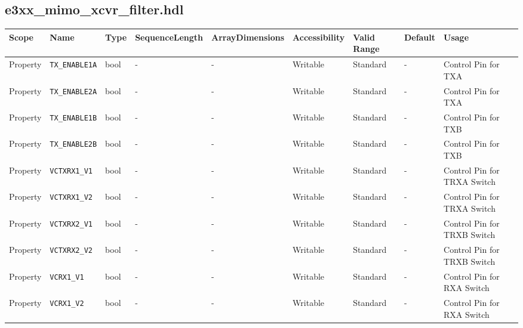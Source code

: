 \documentclass{article}
\def\comp{e3xx\_mimo\_xcvr\_filter}
\def\comp{e3xx\_mimo\_xcvr\_filter}
\begin{document}
\begin{landscape}
\subsection*{\comp.hdl}
	\begin{scriptsize}
		\begin{tabular}{|p{2cm}|p{2.5cm}|p{1cm}|p{2cm}|p{2cm}|p{1.75cm}|p{2cm}|p{2cm}|p{5.29cm}|}
			\hline
			\rowcolor{blue}
			Scope        & Name                 & Type  & SequenceLength & ArrayDimensions & Accessibility & Valid Range & Default & Usage \\
			\hline
			Property     & \verb+TX_ENABLE1A+   & bool  & -              & -               & Writable      & Standard    & -       & Control Pin for TXA    \\
			\hline
			Property     & \verb+TX_ENABLE2A+   & bool  & -              & -               & Writable      & Standard    & -       & Control Pin for TXA    \\
			\hline
			Property     & \verb+TX_ENABLE1B+   & bool  & -              & -               & Writable      & Standard    & -       & Control Pin for TXB    \\
			\hline
			Property     & \verb+TX_ENABLE2B+   & bool  & -              & -               & Writable      & Standard    & -       & Control Pin for TXB    \\
			\hline
			Property     & \verb+VCTXRX1_V1+    & bool  & -              & -               & Writable      & Standard    & -       & Control Pin for TRXA Switch   \\
			\hline
			Property     & \verb+VCTXRX1_V2+    & bool  & -              & -               & Writable      & Standard    & -       & Control Pin for TRXA Switch   \\
			\hline
			Property     & \verb+VCTXRX2_V1+    & bool  & -              & -               & Writable      & Standard    & -       & Control Pin for TRXB Switch   \\
			\hline
			Property     & \verb+VCTXRX2_V2+    & bool  & -              & -               & Writable      & Standard    & -       & Control Pin for TRXB Switch   \\
			\hline
			Property     & \verb+VCRX1_V1+      & bool  & -              & -               & Writable      & Standard    & -       & Control Pin for RXA Switch   \\
			\hline
			Property     & \verb+VCRX1_V2+      & bool  & -              & -               & Writable      & Standard    & -       & Control Pin for RXA Switch   \\

\end{tabular}
\end{scriptsize}
\end{landscape}
\end{document}
